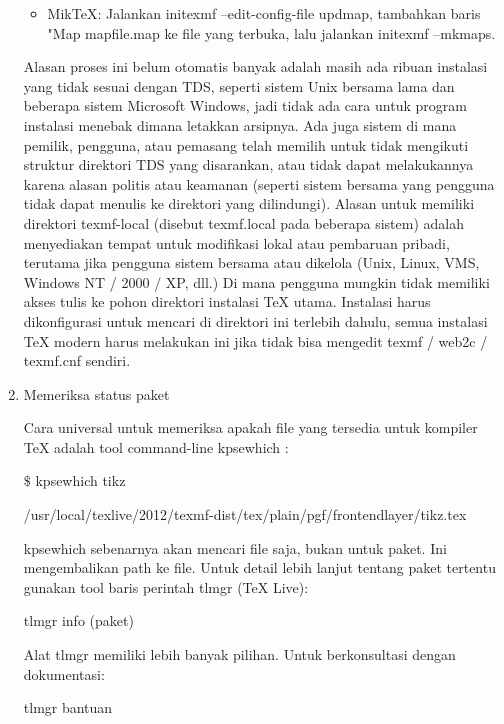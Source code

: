 \begin{enumerate}
\begin{itemize}
\item MikTeX: Jalankan initexmf --edit-config-file updmap, tambahkan baris "Map mapfile.map ke file yang terbuka, lalu jalankan initexmf --mkmaps. \par
\end{itemize}

\vspace{12pt}
\hspace{0.50in} Alasan proses ini belum otomatis banyak adalah masih ada ribuan instalasi yang tidak sesuai dengan TDS, seperti sistem Unix bersama lama dan beberapa sistem Microsoft Windows, jadi tidak ada cara untuk program instalasi menebak dimana letakkan arsipnya. Ada juga sistem di mana pemilik, pengguna, atau pemasang telah memilih untuk tidak mengikuti struktur direktori TDS yang disarankan, atau tidak dapat melakukannya karena alasan politis atau keamanan (seperti sistem bersama yang pengguna tidak dapat menulis ke direktori yang dilindungi). Alasan untuk memiliki direktori texmf-local (disebut texmf.local pada beberapa sistem) adalah menyediakan tempat untuk modifikasi lokal atau pembaruan pribadi, terutama jika pengguna sistem bersama atau dikelola (Unix, Linux, VMS, Windows NT / 2000 / XP, dll.) Di mana pengguna mungkin tidak memiliki akses tulis ke pohon direktori instalasi TeX utama. Instalasi harus dikonfigurasi untuk mencari di direktori ini terlebih dahulu, semua instalasi TeX modern harus melakukan ini jika tidak bisa mengedit texmf / web2c / texmf.cnf sendiri.\par

\vspace{12pt}
\item Memeriksa status paket\par
\hspace{0.50in} Cara universal untuk memeriksa apakah file yang tersedia untuk kompiler TeX adalah tool command-line kpsewhich :\par 
$\$$  kpsewhich tikz \par
/usr/local/texlive/2012/texmf-dist/tex/plain/pgf/frontendlayer/tikz.tex \par
\hspace{0.50in} kpsewhich sebenarnya akan mencari file saja, bukan untuk paket. Ini mengembalikan path ke file. Untuk detail lebih lanjut tentang paket tertentu gunakan tool baris perintah tlmgr (TeX Live): \par
tlmgr info (paket)\par
\hspace{0.50in} Alat tlmgr memiliki lebih banyak pilihan. Untuk berkonsultasi dengan dokumentasi: \par
tlmgr bantuan\par


\end{enumerate}
